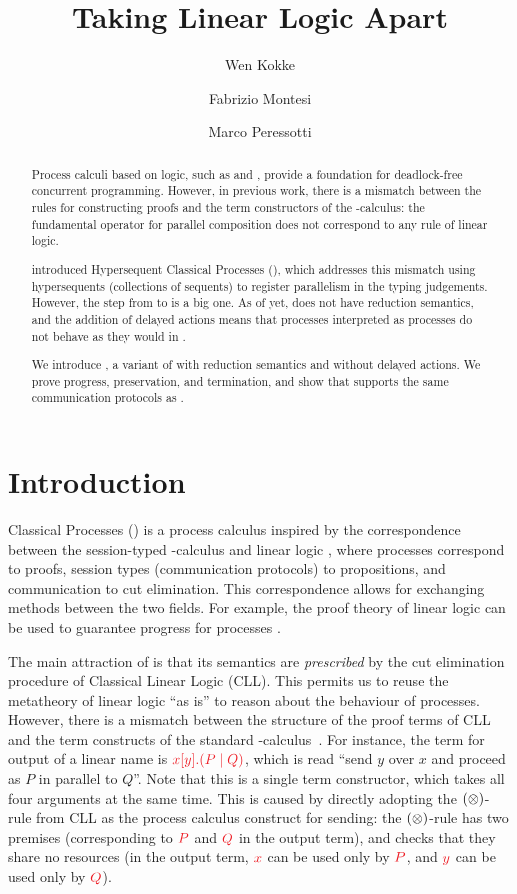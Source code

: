 \documentclass[submission,copyright,creativecommons]{eptcs}
\title{Taking Linear Logic Apart}
\author{%
  Wen Kokke
  \institute{University of Edinburgh\\ Edinburgh, Scotland}
  \email{wen.kokke@ed.ac.uk}
  \and
  Fabrizio Montesi
  \institute{University of Southern Denmark\\ Odense, Denmark}
  \email{fmontesi@imada.sdu.dk}
  \and
  Marco Peressotti
  \institute{University of Southern Denmark\\ Odense, Denmark}
  \email{peressotti@imada.sdu.dk}}
\begin{document}
\maketitle

\begin{abstract}
  Process calculi based on logic, such as \piDILL and \cp, provide a foundation for deadlock-free concurrent programming. However, in previous work, there is a mismatch between the rules for constructing proofs and the term constructors of the \textpi-calculus: the fundamental operator for parallel composition does not correspond to any rule of linear logic.

  \citet{kokke2019} introduced Hypersequent Classical Processes (\hcp), which addresses this mismatch using hypersequents (collections of sequents) to register parallelism in the typing judgements.
  However, the step from \cp to \dhcp is a big one. As of yet, \dhcp does not have reduction semantics, and the addition of delayed actions means that \cp processes interpreted as \dhcp processes do not behave as they would in \cp.

  We introduce \hcp, a variant of \dhcp with reduction semantics and without delayed actions. We prove progress, preservation, and termination, and show that \hcp supports the same communication protocols as \cp.
\end{abstract}

\section{Introduction}
\label{sec:introduction}

Classical Processes (\cp) \citep{wadler2012} is a process calculus inspired by the correspondence between the session-typed \textpi-calculus and linear logic \citep{caires2010}, where processes correspond to proofs, session types (communication protocols) to propositions, and communication to cut elimination. This correspondence allows for exchanging methods between the two fields. For example, the proof theory of linear logic can be used to guarantee progress for processes \citep{caires2010,wadler2012}.

The main attraction of \cp is that its semantics are \emph{prescribed} by the cut elimination procedure of Classical Linear Logic (CLL). This permits us to reuse the metatheory of linear logic ``as is'' to reason about the behaviour of processes. However, there is a mismatch between the structure of the proof terms of CLL and the term constructs of the standard \textpi-calculus~\citep{milner1992a,milner1992b}. For instance, the term for output of a linear name is $\tm{\cpSend{x}{y}{P}{Q}}$, which is read ``send $y$ over $x$ and proceed as $P$ in parallel to $Q$''. Note that this is a single term constructor, which takes all four arguments at the same time. This is caused by directly adopting the $(\otimes)$-rule from CLL as the process calculus construct for sending: the $(\otimes)$-rule has two premises (corresponding to $\tm P$ and $\tm Q$ in the output term), and checks that they share no resources (in the output term, $\tm x$ can be used only by $\tm P$, and $\tm y$ can be used only by $\tm Q$).
\end{document}
